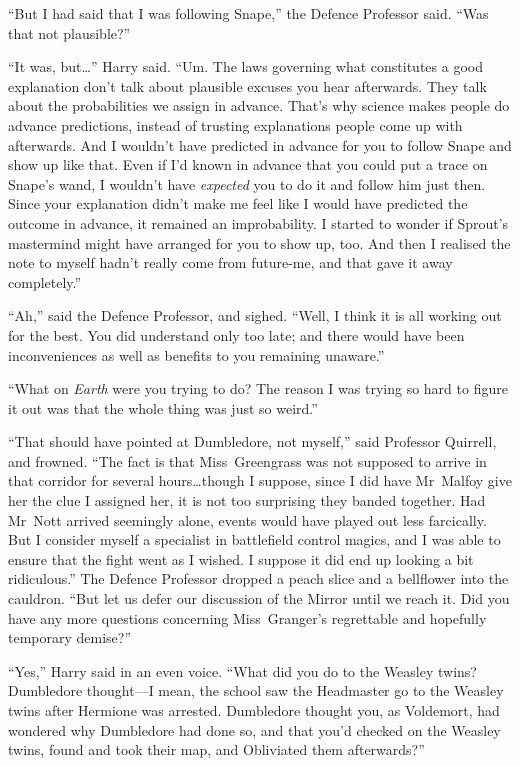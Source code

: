 “But I had said that I was following Snape,” the Defence Professor said. “Was that not plausible?”

“It was, but…” Harry said. “Um. The laws governing what constitutes a good explanation don’t talk about plausible excuses you hear afterwards. They talk about the probabilities we assign in advance. That’s why science makes people do advance predictions, instead of trusting explanations people come up with afterwards. And I wouldn’t have predicted in advance for you to follow Snape and show up like that. Even if I’d known in advance that you could put a trace on Snape’s wand, I wouldn’t have \emph{expected} you to do it and follow him just then. Since your explanation didn’t make me feel like I would have predicted the outcome in advance, it remained an improbability. I started to wonder if Sprout’s mastermind might have arranged for you to show up, too. And then I realised the note to myself hadn’t really come from future-me, and that gave it away completely.”

“Ah,” said the Defence Professor, and sighed. “Well, I think it is all working out for the best. You did understand only too late; and there would have been inconveniences as well as benefits to you remaining unaware.”

“What on \emph{Earth} were you trying to do? The reason I was trying so hard to figure it out was that the whole thing was just so weird.”

“That should have pointed at Dumbledore, not myself,” said Professor Quirrell, and frowned. “The fact is that Miss~Greengrass was not supposed to arrive in that corridor for several hours…though I suppose, since I did have Mr~Malfoy give her the clue I assigned her, it is not too surprising they banded together. Had Mr~Nott arrived seemingly alone, events would have played out less farcically. But I consider myself a specialist in battlefield control magics, and I was able to ensure that the fight went as I wished. I suppose it did end up looking a bit ridiculous.” The Defence Professor dropped a peach slice and a bellflower into the cauldron. “But let us defer our discussion of the Mirror until we reach it. Did you have any more questions concerning Miss~Granger’s regrettable and hopefully temporary demise?”

“Yes,” Harry said in an even voice. “What did you do to the Weasley twins? Dumbledore thought—I mean, the school saw the Headmaster go to the Weasley twins after Hermione was arrested. Dumbledore thought you, as Voldemort, had wondered why Dumbledore had done so, and that you’d checked on the Weasley twins, found and took their map, and Obliviated them afterwards?”

